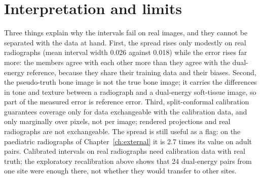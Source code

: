 \section{Interpretation and limits}
Three things explain why the intervals fail on real images, and they cannot be separated with the data at hand. First, the spread rises only
modestly on real radiographs (mean interval width 0.026 against 0.018) while the error rises far more: the members agree with each other more
than they agree with the dual-energy reference, because they share their training data and their biases. Second, the pseudo-truth bone image is not the true bone image;
it carries the differences in tone and texture between a radiograph and a dual-energy soft-tissue image, so part of the measured error is
reference error. Third, split-conformal calibration guarantees coverage only for data exchangeable with the calibration data, and only marginally
over pixels, not per image; rendered projections and real radiographs are not exchangeable. The spread is still useful as a flag: on the
paediatric radiographs of Chapter~\ref{ch:external} it is 2.7 times its value on adult pairs. Calibrated intervals on real radiographs need
calibration data with real truth; the exploratory recalibration above shows that 24 dual-energy pairs from one site were enough there, not
whether they would transfer to other sites.
